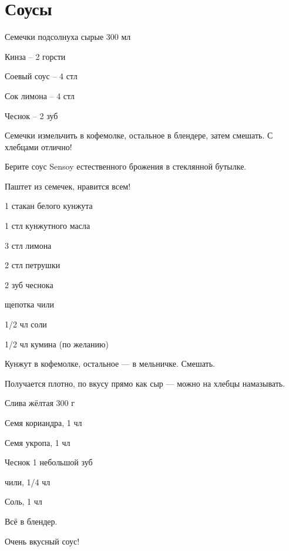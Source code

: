 \chapter*{Соусы}
\label{sec:sauces}


{\label{aiolli}
\item Семечки подсолнуха сырые 300 мл
\item Кинза – 2 горсти
\item Соевый соус – 4 стл
\item Сок лимона – 4 стл
}{
\item Чеснок – 2 зуб
}{
Семечки измельчить в кофемолке, остальное в блендере, затем смешать. С хлебцами отлично!
}{
\begin{advice}
\item Берите соус Sensoy естественного брожения в стеклянной бутылке.
\item Паштет из семечек, нравится всем!
\end{advice}}{}



{\label{takini}
\item 1 стакан белого кунжута 
\item 1 стл кунжутного масла
\item 3 стл лимона
\item 2 стл петрушки
}{
\item 2 зуб чеснока
\item щепотка чили
\item 1/2 чл соли
\item 1/2 чл кумина (по желанию)
}{
Кунжут в кофемолке, остальное — в мельничке. Смешать. 
}{
\begin{advice}
\item Получается плотно, по вкусу прямо как сыр — можно на хлебцы намазывать.
\end{advice}}{}



{
\item Слива жёлтая 300 г
}{
\item Семя кориандра, 1 чл
\item Семя укропа, 1 чл
\item Чеснок 1 небольшой зуб
\item чили, 1/4 чл
\item Соль, 1 чл
}{
Всё в блендер.  
}{
\begin{advice}
\item Очень вкусный соус! 
\end{advice}}{}



